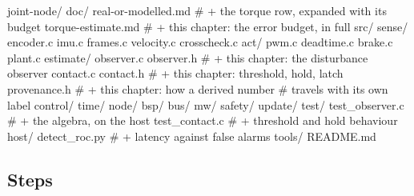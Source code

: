 \begin{plaincode}
joint-node/
  doc/
    real-or-modelled.md             # + the torque row, expanded with its budget
    torque-estimate.md              # + this chapter: the error budget, in full
  src/
    sense/  encoder.c imu.c frames.c velocity.c crosscheck.c
    act/    pwm.c deadtime.c brake.c plant.c
    estimate/
      observer.c observer.h         # + this chapter: the disturbance observer
      contact.c  contact.h          # + this chapter: threshold, hold, latch
      provenance.h                  # + this chapter: how a derived number
                                    #   travels with its own label
    control/ time/ node/ bsp/ bus/ mw/ safety/ update/
  test/
    test_observer.c                 # + the algebra, on the host
    test_contact.c                  # + threshold and hold behaviour
  host/
    detect_roc.py                   # + latency against false alarms
  tools/  README.md
\end{plaincode}

\subsection*{Steps}

